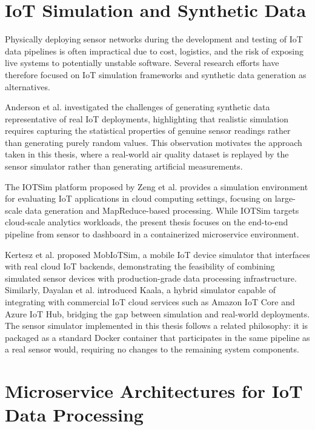\section{IoT Simulation and Synthetic Data}

Physically deploying sensor networks during the development and testing of IoT data pipelines is often impractical due to cost, logistics, and the risk of exposing live systems to potentially unstable software. Several research efforts have therefore focused on IoT simulation frameworks and synthetic data generation as alternatives.

Anderson et al.\cite{7004228} investigated the challenges of generating synthetic data representative of real IoT deployments, highlighting that realistic simulation requires capturing the statistical properties of genuine sensor readings rather than generating purely random values. This observation motivates the approach taken in this thesis, where a real-world air quality dataset is replayed by the sensor simulator rather than generating artificial measurements.

The IOTSim platform proposed by Zeng et al.\cite{ZENG201793} provides a simulation environment for evaluating IoT applications in cloud computing settings, focusing on large-scale data generation and MapReduce-based processing. While IOTSim targets cloud-scale analytics workloads, the present thesis focuses on the end-to-end pipeline from sensor to dashboard in a containerized microservice environment.

Kertesz et al.\cite{s10723-018-9468-9} proposed MobIoTSim, a mobile IoT device simulator that interfaces with real cloud IoT backends, demonstrating the feasibility of combining simulated sensor devices with production-grade data processing infrastructure. Similarly, Dayalan et al.\cite{10.1145/3538393.3544937} introduced Kaala, a hybrid simulator capable of integrating with commercial IoT cloud services such as Amazon IoT Core and Azure IoT Hub, bridging the gap between simulation and real-world deployments. The sensor simulator implemented in this thesis follows a related philosophy: it is packaged as a standard Docker container that participates in the same pipeline as a real sensor would, requiring no changes to the remaining system components.

\section{Microservice Architectures for IoT Data Processing}

